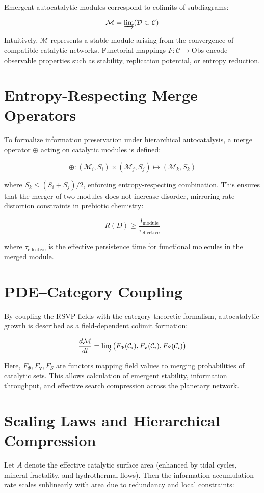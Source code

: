 \documentclass{book}
\begin{document}
Emergent autocatalytic modules correspond to colimits of subdiagrams:

\[\mathcal{M} = \varinjlim (\mathcal{D} \subset \mathcal{C})\]

Intuitively, $\mathcal{M}$ represents a stable module arising from the convergence of compatible catalytic networks. Functorial mappings $F: \mathcal{C} \to \mathrm{Obs}$ encode observable properties such as stability, replication potential, or entropy reduction.

\section{Entropy-Respecting Merge Operators}
To formalize information preservation under hierarchical autocatalysis, a merge operator $\oplus$ acting on catalytic modules is defined:

\[\oplus: (\mathcal{M}_i, S_i) \times (\mathcal{M}_j, S_j) \mapsto (\mathcal{M}_k, S_k)\]

where $S_k \le (S_i + S_j)/2$, enforcing entropy-respecting combination. This ensures that the merger of two modules does not increase disorder, mirroring rate-distortion constraints in prebiotic chemistry:

\[R(D) \ge \frac{I_{\text{module}}}{\tau_{\text{effective}}}\]

where $\tau_{\text{effective}}$ is the effective persistence time for functional molecules in the merged module.

\section{PDE–Category Coupling}
By coupling the RSVP fields with the category-theoretic formalism, autocatalytic growth is described as a field-dependent colimit formation:

\[\frac{d \mathcal{M}}{dt} = \varinjlim\big(F_\Phi(\mathcal{C}_i), F_\mathbf{v}(\mathcal{C}_i), F_S(\mathcal{C}_i)\big)\]

Here, $F_\Phi, F_\mathbf{v}, F_S$ are functors mapping field values to merging probabilities of catalytic sets. This allows calculation of emergent stability, information throughput, and effective search compression across the planetary network.

\section{Scaling Laws and Hierarchical Compression}
Let $A$ denote the effective catalytic surface area (enhanced by tidal cycles, mineral fractality, and hydrothermal flows). Then the information accumulation rate scales sublinearly with area due to redundancy and local constraints:
\end{document}
